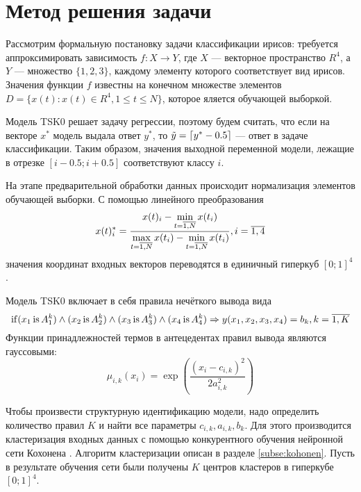 \section{Метод решения задачи}
Рассмотрим формальную постановку задачи классификации ирисов: требуется аппроксимировать зависимость
\(f :X \rightarrow Y\),
где \(X\) --- векторное пространство \(R^4\), а \(Y\) --- множество \(\{1,2,3\}\),
каждому элементу которого соответствует вид ирисов. Значения функции \(f\) известны
на конечном множестве элементов \(D=\{x(t):x(t)\in R^4, 1 \leqslant t \leqslant N\}\),
которое яляется обучающей выборкой.
\par
Модель TSK0 решает задачу регрессии, поэтому будем считать, что если на векторе \(x^*\)
модель выдала ответ \(y^*\), то \(\tilde y = \lceil y^*-0.5\rceil\) --- ответ в задаче классификации.
Таким образом, значения выходной переменной модели, лежащие в отрезке \([i-0.5;i+0.5]\)
соответствуют классу \(i\).
\par
На этапе предварительной обработки данных происходит нормализация элементов обучающей выборки.
С помощью линейного преобразования
\begin{displaymath}
x(t)_i^* = \frac{\displaystyle x(t)_i - \min_{t=\overline{1,N}} x(t_i)}{ \\*
\displaystyle \max_{t=\overline{1,N}} x(t_i)-\min_{t=\overline{1,N}} x(t_i)}
,i=\overline{1,4}
\end{displaymath}
значения координат входных векторов переводятся в единичный гиперкуб \([0;1]^4\).
\par
Модель TSK0 включает в себя правила нечёткого вывода вида
\begin{displaymath}
\operatorname{if}(x_1 \operatorname{is} A_1^k) \land (x_2 \operatorname{is} A_2^k) \land (x_3 \operatorname{is} A_3^k) \land (x_4 \operatorname{is} A_4^k)\Rightarrow y(x_1,x_2,x_3,x_4)=b_k,
k=\overline{1,K}
\end{displaymath}
Функции принадлежностей термов в антецедентах правил вывода являются гауссовыми:
\begin{displaymath}
\mu_{i,k}(x_i)=\exp \left( \frac{(x_i-c_{i,k})^2}{2a_{i,k}^2} \right)
\end{displaymath}
\par
Чтобы произвести структурную идентификацию модели, надо определить количество правил \(K\) и
найти все параметры \(c_{i,k},a_{i,k},b_k\). Для этого производится кластеризация
входных данных с помощью конкурентного обучения нейронной сети Кохонена \cite{neuralNetworks}.
Алгоритм кластеризации описан в разделе \ref{subse:kohonen}.
Пусть в результате обучения сети были получены \(K\) центров кластеров в гиперкубе \([0;1]^4\).
